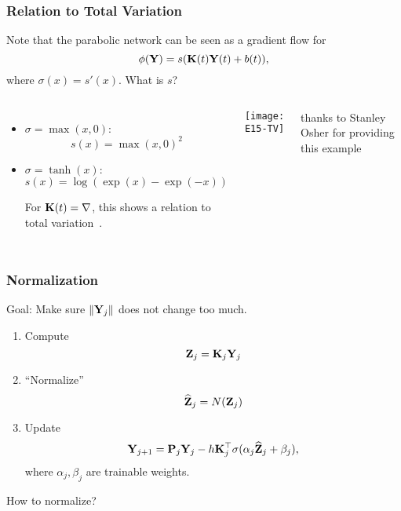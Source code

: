 \documentclass[12pt,fleqn,handout]{beamer}
\begin{document}
\begin{frame}
	\frametitle{Relation to Total Variation}
	

	Note that the parabolic network can be seen as a gradient flow for
	$$
		\phi({\bf Y}) = s({\bf K}(t) {\bf Y}(t) + b(t)),
	$$
	where $\sigma(x) = s'(x)$. What is $s$?
	
	\begin{columns}
	\begin{itemize}
		\item $\sigma = \max(x,0)$: 
		$$
			s(x) = \max(x,0)^2
		$$
		\item $\sigma = \tanh(x)$:
		$$
			s(x) = \log(\exp(x) - \exp(-x))
		$$
		
		For ${\bf K}(t) = \nabla$, this shows a relation to total variation~\cite{RudinOsherFatemi1992}.
	\end{itemize}
		
		\texttt{[image: E15-TV]}
		
		\footnotesize thanks to Stanley Osher for providing this example
	\end{columns}
\end{frame}


\begin{frame}[fragile]\frametitle{Normalization}

Goal: Make sure $\|{\bf Y}_j\|$ does not change too much.


\bigskip

\begin{enumerate}
	\item Compute
$$ {\bf Z}_j = {\bf K}_j {\bf Y}_j $$

	\item ``Normalize''
$$ \widehat {{\bf Z}}_j = N( {\bf Z}_j) $$

	\item Update
	$$ 
	{\bf Y}_{j+1} = {\bf P}_j{\bf Y}_j - h {\bf K}_j^\top  \sigma( \alpha_j  \widehat {{\bf Z}}_j + \beta_j), $$
	where $\alpha_j,\beta_j$ are trainable weights.

\end{enumerate}





\bigskip
\bigskip

\begin{center}
How to normalize?	
\end{center}


\end{frame}
\end{document}
